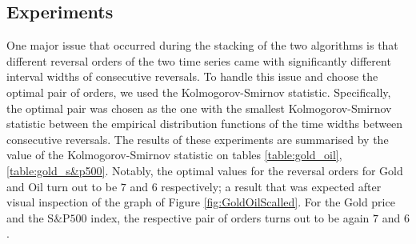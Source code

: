 \documentclass[a4, 11pt]{article}
\begin{document}
\subsection{Experiments}
One major issue that occurred during the stacking of the two algorithms is that different reversal orders of the two time series came with significantly different interval widths of consecutive reversals. To handle this issue and choose the optimal pair of orders, we used the Kolmogorov-Smirnov statistic. Specifically, the optimal pair was chosen as the one with the smallest Kolmogorov-Smirnov statistic between the empirical distribution functions of the time widths between consecutive reversals. The results of these experiments are summarised by the value of the Kolmogorov-Smirnov statistic on tables \ref{table:gold_oil}, \ref{table:gold_s&p500}. Notably, the optimal values for the reversal orders for Gold and Oil turn out to be $7$ and $6$ respectively; a result that was expected after visual inspection of the graph of Figure \ref{fig:GoldOilScalled}. For the Gold price and the S$\&$P$500$ index, the respective pair of orders turns out to be again $7$ and $6$. 
\end{document}
